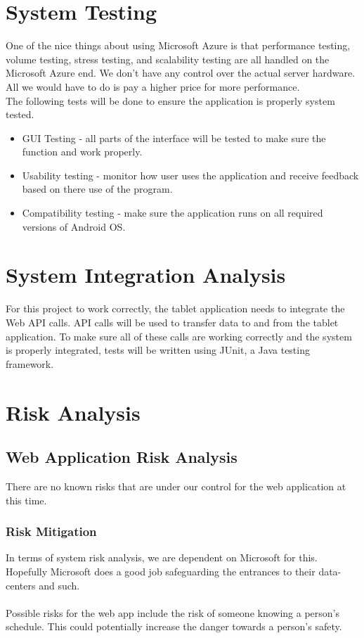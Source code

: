 \section{System Testing}

One of the nice things about using Microsoft Azure is that performance testing, 	volume testing, stress testing, and scalability testing are all handled on the Microsoft Azure end. We don't have any control over the actual server hardware. All we would have to do is pay a higher price for more performance.\\

\noindent The following tests will be done to ensure the application is properly system tested.

\begin{itemize}
  \item GUI Testing - all parts of the interface will be tested to make sure the function and work properly.
  \item Usability testing - monitor how user uses the application and receive feedback based on there use of the program.
  \item Compatibility testing - make sure the application runs on all required versions of Android OS.
\end{itemize}

\section{System Integration Analysis}
For this project to work correctly, the tablet application needs to integrate the Web API calls.  API calls will be used to transfer data to and from the tablet application. To make sure all of these calls are working correctly and the system is properly integrated, tests will be written using JUnit, a Java testing framework.

\section{Risk Analysis}

\subsection{Web Application Risk Analysis}
There are no known risks that are under our control for the web application at this time.
\subsubsection{Risk Mitigation}
In terms of system risk analysis, we are  dependent on Microsoft for this. Hopefully Microsoft does a good job safeguarding the entrances to their data-centers and such.\\\\
\noindent
Possible risks for the web app include the risk of someone knowing a person's schedule. This could potentially increase the danger towards a person's safety. 

